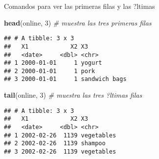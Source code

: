\documentclass[
  ignorenonframetext,
]{beamer}
\newenvironment{Shaded}{\begin{snugshade}}{\end{snugshade}}
\newcommand{\CommentTok}[1]{\textcolor[rgb]{0.56,0.35,0.01}{\textit{#1}}}
\newcommand{\DecValTok}[1]{\textcolor[rgb]{0.00,0.00,0.81}{#1}}
\newcommand{\KeywordTok}[1]{\textcolor[rgb]{0.13,0.29,0.53}{\textbf{#1}}}
\newcommand{\NormalTok}[1]{#1}
\begin{document}
\begin{frame}[fragile]{Comandos para ver las primeras filas y las
?ltimas}
\protect\hypertarget{comandos-para-ver-las-primeras-filas-y-las-ltimas}{}

\begin{Shaded}
\begin{Highlighting}[]
\KeywordTok{head}\NormalTok{(online, }\DecValTok{3}\NormalTok{) }\CommentTok{#  muestra las tres primeras filas}
\end{Highlighting}
\end{Shaded}

\begin{verbatim}
## # A tibble: 3 x 3
##   X1            X2 X3           
##   <date>     <dbl> <chr>        
## 1 2000-01-01     1 yogurt       
## 2 2000-01-01     1 pork         
## 3 2000-01-01     1 sandwich bags
\end{verbatim}

\begin{Shaded}
\begin{Highlighting}[]
\KeywordTok{tail}\NormalTok{(online, }\DecValTok{3}\NormalTok{) }\CommentTok{# muestra las tres ?ltimas filas}
\end{Highlighting}
\end{Shaded}

\begin{verbatim}
## # A tibble: 3 x 3
##   X1            X2 X3        
##   <date>     <dbl> <chr>     
## 1 2002-02-26  1139 vegetables
## 2 2002-02-26  1139 shampoo   
## 3 2002-02-26  1139 vegetables
\end{verbatim}

\end{frame}
\end{document}
